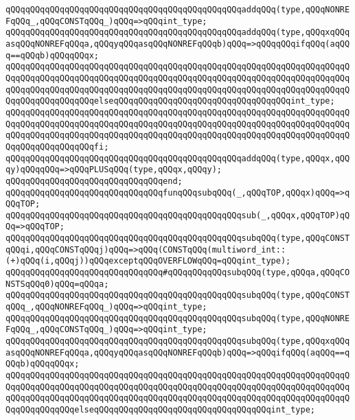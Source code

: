 \verb|qQQqqQQqqQQqqQQqqQQqqQQqqQQqqQQqqQQqqQQqqQQqqQQqaddqQQq(type,qQQqNONREFqQQq_,qQQqCONSTqQQq_)qQQq=>qQQqint_type;|\newline
\verb|qQQqqQQqqQQqqQQqqQQqqQQqqQQqqQQqqQQqqQQqqQQqqQQqaddqQQq(type,qQQqxqQQqasqQQqNONREFqQQqa,qQQqyqQQqasqQQqNONREFqQQqb)qQQq=>qQQqqQQqifqQQq(aqQQq==qQQqb)qQQqqQQqx;|\newline
\verb|qQQqqQQqqQQqqQQqqQQqqQQqqQQqqQQqqQQqqQQqqQQqqQQqqQQqqQQqqQQqqQQqqQQqqQQqqQQqqQQqqQQqqQQqqQQqqQQqqQQqqQQqqQQqqQQqqQQqqQQqqQQqqQQqqQQqqQQqqQQqqQQqqQQqqQQqqQQqqQQqqQQqqQQqqQQqqQQqqQQqqQQqqQQqqQQqqQQqqQQqqQQqqQQqqQQqqQQqqQQqqQQqqQQqelseqQQqqQQqqQQqqQQqqQQqqQQqqQQqqQQqqQQqint_type;|\newline
\verb|qQQqqQQqqQQqqQQqqQQqqQQqqQQqqQQqqQQqqQQqqQQqqQQqqQQqqQQqqQQqqQQqqQQqqQQqqQQqqQQqqQQqqQQqqQQqqQQqqQQqqQQqqQQqqQQqqQQqqQQqqQQqqQQqqQQqqQQqqQQqqQQqqQQqqQQqqQQqqQQqqQQqqQQqqQQqqQQqqQQqqQQqqQQqqQQqqQQqqQQqqQQqqQQqqQQqqQQqqQQqqQQqqQQqfi;|\newline
\verb|qQQqqQQqqQQqqQQqqQQqqQQqqQQqqQQqqQQqqQQqqQQqqQQqaddqQQq(type,qQQqx,qQQqy)qQQqqQQq=>qQQqPLUSqQQq(type,qQQqx,qQQqy);|\newline
\verb|qQQqqQQqqQQqqQQqqQQqqQQqqQQqqQQqend;|\newline
\newline
\verb|qQQqqQQqqQQqqQQqqQQqqQQqqQQqqQQqfunqQQqsubqQQq(_,qQQqTOP,qQQqx)qQQq=>qQQqTOP;|\newline
\verb|qQQqqQQqqQQqqQQqqQQqqQQqqQQqqQQqqQQqqQQqqQQqqQQqsub(_,qQQqx,qQQqTOP)qQQq=>qQQqTOP;|\newline
\verb|qQQqqQQqqQQqqQQqqQQqqQQqqQQqqQQqqQQqqQQqqQQqqQQqsubqQQq(type,qQQqCONSTqQQqi,qQQqCONSTqQQqj)qQQq=>qQQq(CONSTqQQq(multiword_int::(+)qQQq(i,qQQqj))qQQqexceptqQQqOVERFLOWqQQq=qQQqint_type);|\newline
\verb|qQQqqQQqqQQqqQQqqQQqqQQqqQQqqQQq#qQQqqQQqqQQqsubqQQq(type,qQQqa,qQQqCONSTSqQQq0)qQQq=qQQqa;|\newline
\verb|qQQqqQQqqQQqqQQqqQQqqQQqqQQqqQQqqQQqqQQqqQQqqQQqsubqQQq(type,qQQqCONSTqQQq_,qQQqNONREFqQQq_)qQQq=>qQQqint_type;|\newline
\verb|qQQqqQQqqQQqqQQqqQQqqQQqqQQqqQQqqQQqqQQqqQQqqQQqsubqQQq(type,qQQqNONREFqQQq_,qQQqCONSTqQQq_)qQQq=>qQQqint_type;|\newline
\verb|qQQqqQQqqQQqqQQqqQQqqQQqqQQqqQQqqQQqqQQqqQQqqQQqsubqQQq(type,qQQqxqQQqasqQQqNONREFqQQqa,qQQqyqQQqasqQQqNONREFqQQqb)qQQq=>qQQqifqQQq(aqQQq==qQQqb)qQQqqQQqx;|\newline
\verb|qQQqqQQqqQQqqQQqqQQqqQQqqQQqqQQqqQQqqQQqqQQqqQQqqQQqqQQqqQQqqQQqqQQqqQQqqQQqqQQqqQQqqQQqqQQqqQQqqQQqqQQqqQQqqQQqqQQqqQQqqQQqqQQqqQQqqQQqqQQqqQQqqQQqqQQqqQQqqQQqqQQqqQQqqQQqqQQqqQQqqQQqqQQqqQQqqQQqqQQqqQQqqQQqqQQqqQQqqQQqqQQqelseqQQqqQQqqQQqqQQqqQQqqQQqqQQqqQQqqQQqint_type;|\newline
